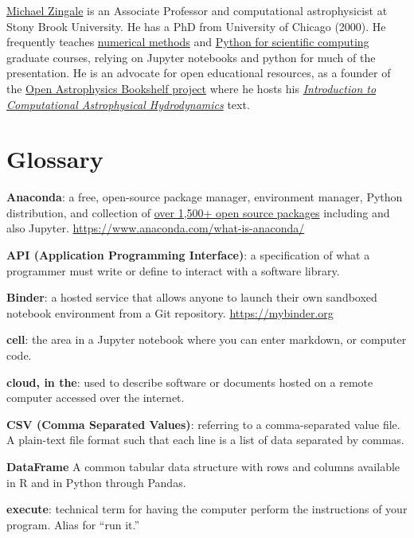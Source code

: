 \documentclass[]{book}
\begin{document}
\href{http://www.astro.sunysb.edu/mzingale/}{Michael Zingale} is an Associate Professor
and computational astrophysicist at Stony Brook University.
He has a PhD from University of Chicago (2000). He frequently teaches
\href{http://bender.astro.sunysb.edu/classes/numerical_methods/}{numerical methods} and
\href{http://bender.astro.sunysb.edu/classes/python-science/}{Python for scientific computing}
graduate courses, relying on Jupyter notebooks and python for much of the presentation.
He is an advocate for open educational resources, as a founder of the
\href{https://github.com/Open-Astrophysics-Bookshelf/}{Open Astrophysics Bookshelf project}
where he hosts his \href{http://bender.astro.sunysb.edu/hydro_by_example/CompHydroTutorial.pdf}{\emph{Introduction to Computational Astrophysical Hydrodynamics}}
text.

\hypertarget{glossary}{%
\chapter{Glossary}\label{glossary}}

\textbf{Anaconda}: a free, open-source package manager, environment manager, Python distribution,
and collection of
\href{https://docs.anaconda.com/anaconda/packages/pkg-docs/}{over 1,500+ open source packages}
including and also Jupyter.
\url{https://www.anaconda.com/what-is-anaconda/}

\textbf{API (Application Programming Interface)}: a specification of what a
programmer must write or define to interact with a software library.

\textbf{Binder}: a hosted service that allows anyone to launch their own sandboxed notebook environment from
a Git repository. \url{https://mybinder.org}

\textbf{cell}: the area in a Jupyter notebook where you can enter markdown, or computer code.

\textbf{cloud, in the}: used to describe software or documents hosted on a remote computer
accessed over the internet.

\textbf{CSV (Comma Separated Values)}: referring to a comma-separated value file.
A plain-text file format such that each line is a list of data separated by commas.

\textbf{DataFrame} A common tabular data structure with rows and columns available
in R and in Python through Pandas.

\textbf{execute}: technical term for having the computer perform the instructions of your program.
Alias for ``run it.''
\end{document}
